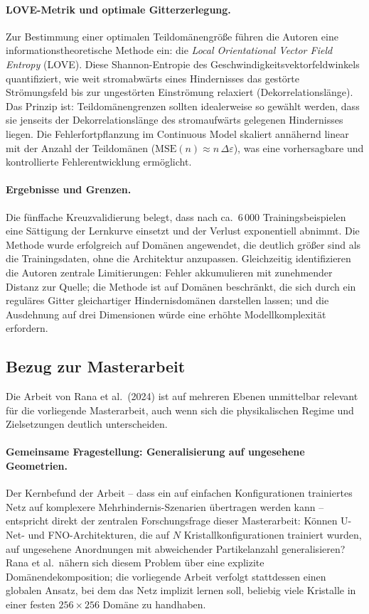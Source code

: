 \documentclass[a4paper,12pt]{article}
\begin{document}
\paragraph{LOVE-Metrik und optimale Gitterzerlegung.}
Zur Bestimmung einer optimalen Teildomänengröße führen die Autoren eine informationstheoretische
Methode ein: die \emph{Local Orientational Vector Field Entropy} (LOVE). Diese Shannon-Entropie
des Geschwindigkeitsvektorfeldwinkels quantifiziert, wie weit stromabwärts eines Hindernisses
das gestörte Strömungsfeld bis zur ungestörten Einströmung relaxiert (Dekorrela\-tionslänge).
Das Prinzip ist: Teildomänengrenzen sollten idealerweise so gewählt werden, dass sie jenseits
der Dekorrelationslänge des stromaufwärts gelegenen Hindernisses liegen. Die Fehlerfortpflanzung
im Continuous Model skaliert annähernd linear mit der Anzahl der Teildomänen
($\mathrm{MSE}(n) \approx n\,\Delta\varepsilon$), was eine vorhersagbare und kontrollierte
Fehlerentwicklung ermöglicht.

\paragraph{Ergebnisse und Grenzen.}
Die fünffache Kreuzvalidierung belegt, dass nach ca.\ 6\,000 Trainingsbeispielen eine
Sättigung der Lernkurve einsetzt und der Verlust exponentiell abnimmt. Die Methode wurde
erfolgreich auf Domänen angewendet, die deutlich größer sind als die Trainingsdaten, ohne
die Architektur anzupassen. Gleichzeitig identifizieren die Autoren zentrale Limitierungen:
Fehler akkumulieren mit zunehmender Distanz zur Quelle; die Methode ist auf Domänen
beschränkt, die sich durch ein reguläres Gitter gleichartiger Hindernisdomänen darstellen
lassen; und die Ausdehnung auf drei Dimensionen würde eine erhöhte Modellkomplexität
erfordern.

\subsection*{Bezug zur Masterarbeit}

Die Arbeit von Rana et al.\ (2024) ist auf mehreren Ebenen unmittelbar relevant für die
vorliegende Masterarbeit, auch wenn sich die physikalischen Regime und Zielsetzungen
deutlich unterscheiden.

\paragraph{Gemeinsame Fragestellung: Generalisierung auf ungesehene Geometrien.}
Der Kernbefund der Arbeit -- dass ein auf einfachen Konfigurationen trainiertes Netz auf
komplexere Mehrhindernis-Szenarien übertragen werden kann -- entspricht direkt der
zentralen Forschungsfrage dieser Masterarbeit: Können U-Net- und FNO-Architekturen,
die auf $N$ Kristallkonfigurationen trainiert wurden, auf ungesehene Anordnungen mit
abweichender Partikelanzahl generalisieren? Rana et al.\ nähern sich diesem Problem über
eine explizite Domänendekomposition; die vorliegende Arbeit verfolgt stattdessen einen
globalen Ansatz, bei dem das Netz implizit lernen soll, beliebig viele Kristalle in einer
festen $256 \times 256$ Domäne zu handhaben.
\end{document}
